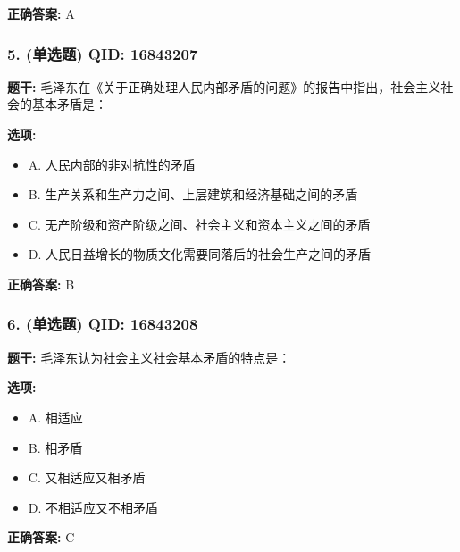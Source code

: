 \documentclass[12pt,UTF8]{ctexart}
\begin{document}
\textbf{正确答案:}
A

\vspace{0.3em}\hrulefill\vspace{0.7em}

\subsubsection*{5. (单选题) \small QID: 16843207}

\textbf{题干:}
毛泽东在《关于正确处理人民内部矛盾的问题》的报告中指出，社会主义社会的基本矛盾是：

\textbf{选项:}
\begin{itemize}[leftmargin=*]

  \item A. 人民内部的非对抗性的矛盾

  \item B. 生产关系和生产力之间、上层建筑和经济基础之间的矛盾

  \item C. 无产阶级和资产阶级之间、社会主义和资本主义之间的矛盾

  \item D. 人民日益增长的物质文化需要同落后的社会生产之间的矛盾

\end{itemize}

\textbf{正确答案:}
B

\vspace{0.3em}\hrulefill\vspace{0.7em}

\subsubsection*{6. (单选题) \small QID: 16843208}

\textbf{题干:}
毛泽东认为社会主义社会基本矛盾的特点是：

\textbf{选项:}
\begin{itemize}[leftmargin=*]

  \item A. 相适应

  \item B. 相矛盾

  \item C. 又相适应又相矛盾

  \item D. 不相适应又不相矛盾

\end{itemize}

\textbf{正确答案:}
C
\end{document}
